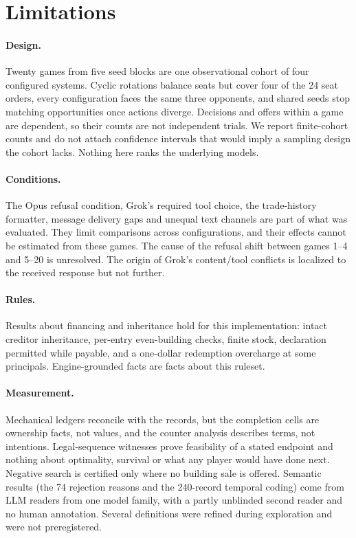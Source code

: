 \section{Limitations}
\label{sec:limitations}

\paragraph{Design.} Twenty games from five seed blocks are one observational cohort of four configured systems. Cyclic rotations balance seats but cover four of the 24 seat orders, every configuration faces the same three opponents, and shared seeds stop matching opportunities once actions diverge. Decisions and offers within a game are dependent, so their counts are not independent trials. We report finite-cohort counts and do not attach confidence intervals that would imply a sampling design the cohort lacks. Nothing here ranks the underlying models.

\paragraph{Conditions.} The Opus refusal condition, Grok's required tool choice, the trade-history formatter, message delivery gaps and unequal text channels are part of what was evaluated. They limit comparisons across configurations, and their effects cannot be estimated from these games. The cause of the refusal shift between games 1--4 and 5--20 is unresolved. The origin of Grok's content/tool conflicts is localized to the received response but not further.

\paragraph{Rules.} Results about financing and inheritance hold for this implementation: intact creditor inheritance, per-entry even-building checks, finite stock, declaration permitted while payable, and a one-dollar redemption overcharge at some principals. Engine-grounded facts are facts about this ruleset.

\paragraph{Measurement.} Mechanical ledgers reconcile with the records, but the completion cells are ownership facts, not values, and the counter analysis describes terms, not intentions. Legal-sequence witnesses prove feasibility of a stated endpoint and nothing about optimality, survival or what any player would have done next. Negative search is certified only where no building sale is offered. Semantic results (the 74 rejection reasons and the 240-record temporal coding) come from LLM readers from one model family, with a partly unblinded second reader and no human annotation. Several definitions were refined during exploration and were not preregistered.

